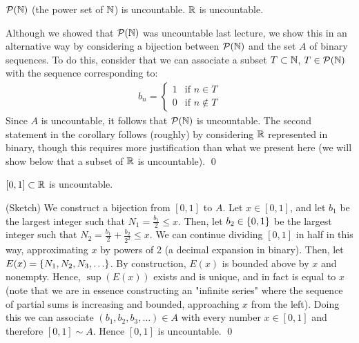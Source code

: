 \begin{ncorollary}{}{}
    $\mathcal{P}(\mathbb{N})$ (the power set of $\mathbb{N}$) is uncountable. $\mathbb{R}$ is uncountable.
\end{ncorollary}
\begin{nproof}
    Although we showed that $\mathcal{P}(\mathbb{N})$ was uncountable last lecture, we show this in an alternative way by considering a bijection between $\mathcal{P}(\mathbb{N})$ and the set $A$ of binary sequences. To do this, consider that we can associate a subset $T \subset \mathbb{N}$, $T \in \mathcal{P}(\mathbb{N})$ with the sequence corresponding to:
    \begin{align*}
        b_n = \begin{cases}
            1 & \text{if $n \in T$}
            \\ 0 & \text{if $n \notin T$}
        \end{cases}
    \end{align*}
    Since $A$ is uncountable, it follows that $\mathcal{P}(\mathbb{N})$ is uncountable. The second statement in the corollary follows (roughly) by considering $\mathbb{R}$ represented in binary, though this requires more justification than what we present here (we will show below that a subset of $\mathbb{R}$ is uncountable). \qed
\end{nproof}
\begin{ntheorem}{}{}
    $[0, 1] \subset \mathbb{R}$ is uncountable.
\end{ntheorem}
\begin{nproof}
    (Sketch) We construct a bijection from $[0, 1]$ to $A$. Let $x \in [0,1]$, and let $b_1$ be the largest integer such that $N_1 = \frac{b_1}{2} \leq x$. Then, let $b_2 \in \set{0, 1}$ be the largest integer such that $N_2 = \frac{b_1}{2} + \frac{b_2}{2^2} \leq x$. We can continue dividing $[0,1]$ in half in this way, approximating $x$ by powers of 2 (a decimal expansion in binary). Then, let $E(x) = \set{N_1, N_2, N_3, \ldots}$. By construction, $E(x)$ is bounded above by $x$ and nonempty. Hence, $\sup(E(x))$ exists and is unique, and in fact is equal to $x$ (note that we are in essence constructing an "infinite series" where the sequence of partial sums is increasing and bounded, approaching $x$ from the left). Doing this we can associate $(b_1, b_2, b_3, \ldots) \in A$ with every number $x \in [0, 1]$ and therefore $[0, 1] \sim A$. Hence $[0, 1]$ is uncountable. \qed
\end{nproof}

